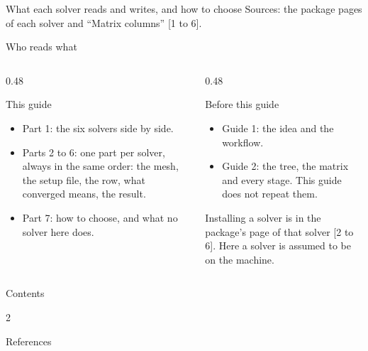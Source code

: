 \documentclass[aspectratio=169,11pt]{beamer}
\begin{document}
  {What each solver reads and writes, and how to choose}
  {Sources: the package pages of each solver and ``Matrix columns''
   [1 to 6].}

\begin{frame}{Who reads what}
\begin{columns}[T]
\begin{column}{0.48\textwidth}
\begin{block}{This guide}
\begin{itemize}\small
  \item Part 1: the six solvers side by side.
  \item Parts 2 to 6: one part per solver, always in the same order: the
        mesh, the setup file, the row, what converged means, the result.
  \item Part 7: how to choose, and what no solver here does.
\end{itemize}
\end{block}
\end{column}
\begin{column}{0.48\textwidth}
\begin{block}{Before this guide}
\begin{itemize}\small
  \item Guide 1: the idea and the workflow.
  \item Guide 2: the tree, the matrix and every stage. This guide does not
        repeat them.
\end{itemize}
\end{block}
Installing a solver is in the package's page of that solver [2 to 6]. Here a
solver is assumed to be on the machine.
\end{column}
\end{columns}
\end{frame}

\begin{frame}{Contents}
\begin{multicols}{2}
\tableofcontents
\end{multicols}
\end{frame}






\begin{frame}{References}
\begin{reflist}
   
   
   
   
   
   
   
   
\end{reflist}
\end{frame}
\end{document}
